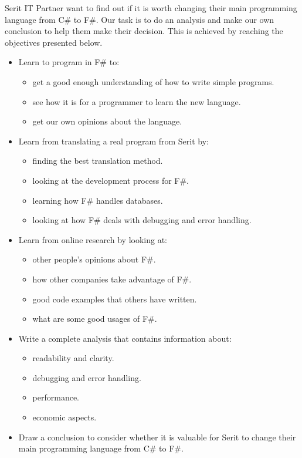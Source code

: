 \documentclass[12pt, a4paper]{article}
\begin{document}
Serit IT Partner want to find out if it is worth changing their main programming language from C\# to F\#. Our task is to do an analysis and make our own conclusion to help them make their decision. This is achieved by reaching the objectives presented below.

\begin{itemize}

	\item Learn to program in F\# to:
	\begin{itemize}
		\item get a good enough understanding of how to write simple programs.
		\item see how it is for a programmer to learn the new language.
		\item get our own opinions about the language.
	\end{itemize}
	
	\item Learn from translating a real program from Serit by:
	\begin{itemize}
		\item finding the best translation method.
		\item looking at the development process for F\#.
		\item learning how F\# handles databases.
		\item looking at how F\# deals with debugging and error handling.
		
	\end{itemize}
	\item Learn from online research by looking at:
	\begin{itemize}
		\item other people's opinions about F\#.
		\item how other companies take advantage of F\#.
		\item good code examples that others have written.
		\item what are some good usages of F\#.
	\end{itemize}
	
	\item Write a complete analysis that contains information about:
	\begin{itemize}
		\item readability and clarity.
		\item debugging and error handling.
		\item performance.
		\item economic aspects.
	\end{itemize}
	
	\item Draw a conclusion to consider whether it is valuable for Serit to change their main programming language from C\# to F\#.
	
\end{itemize}
\end{document}

